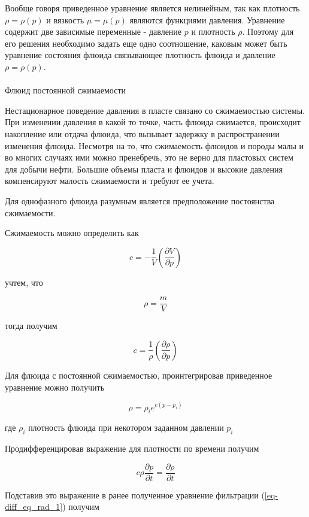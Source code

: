 \documentclass[
  russian,
  letterpaper,
  DIV=11,
  numbers=noendperiod,
  oneside]{scrartcl}
\makeatletter
\let\oldparagraph\paragraph
\renewcommand{\paragraph}{
    \@ifstar
      \xxxParagraphStar
      \xxxParagraphNoStar
  }
\newcommand{\xxxParagraphStar}[1]{\oldparagraph*{#1}\mbox{}}
\newcommand{\xxxParagraphNoStar}[1]{\oldparagraph{#1}\mbox{}}
\makeatother
\begin{document}
Вообще говоря приведенное уравнение является нелинейным, так как
плотность \(\rho = \rho(p)\) и вязкость \(\mu = \mu(p)\) являются
функциями давления. Уравнение содержит две зависимые переменные -
давление \(p\) и плотность \(\rho\). Поэтому для его решения необходимо
задать еще одно соотношение, каковым может быть уравнение состояния
флюида связывающее плотность флюида и давление \(\rho = \rho(p)\).

\paragraph{Флюид постоянной
сжимаемости}\label{ux444ux43bux44eux438ux434-ux43fux43eux441ux442ux43eux44fux43dux43dux43eux439-ux441ux436ux438ux43cux430ux435ux43cux43eux441ux442ux438}

Нестационарное поведение давления в пласте связано со сжимаемостью
системы. При изменении давления в какой то точке, часть флюида
сжимается, происходит накопление или отдача флюида, что вызывает
задержку в распространении изменения флюида. Несмотря на то, что
сжимаемость флюидов и породы малы и во многих случаях ими можно
пренебречь, это не верно для пластовых систем для добычи нефти. Большие
объемы пласта и флюидов и высокие давления компенсируют малость
сжимаемости и требуют ее учета.

Для однофазного флюида разумным является предположение постоянства
сжимаемости.

Сжимаемость можно определить как

\[
c=-\frac{1}{V} \left(  \frac{ \partial V}{ \partial p}  \right) 
\]

учтем, что

\[
 \rho = \frac{m}{V} 
\]

тогда получим

\[
c=\frac{1}{\rho} \left(  \frac{ \partial \rho}{ \partial p}  \right) 
\]

Для флюида с постоянной сжимаемостью, проинтегрировав приведенное
уравнение можно получить

\[
\rho = \rho_i e^{c(p-p_i)}
\]

где \(\rho_i\) плотность флюида при некотором заданном давлении \(p_i\)

Продифференцировав выражение для плотности по времени получим

\[
c \rho \frac{\partial p}{\partial t} = \frac{\partial \rho}{\partial t}
\]

Подставив это выражение в ранее полученное уравнение фильтрации
(\ref{eq-diff_eq_rad_1}) получим
\end{document}
